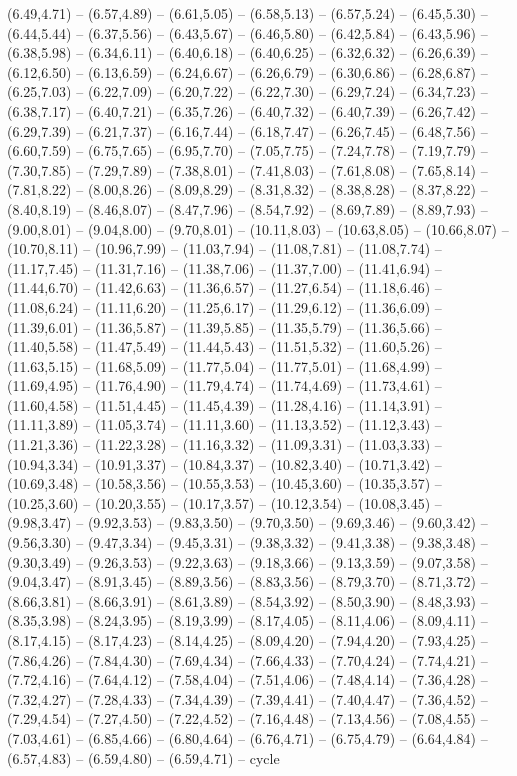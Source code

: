 \expandafter\def\csname geo:gebiet:heute-POL\endcsname{
  (6.49,4.71) -- (6.57,4.89) -- (6.61,5.05) -- (6.58,5.13) -- (6.57,5.24) -- (6.45,5.30) -- (6.44,5.44) -- (6.37,5.56) -- (6.43,5.67) -- (6.46,5.80) -- (6.42,5.84) -- (6.43,5.96) -- (6.38,5.98) -- (6.34,6.11) -- (6.40,6.18) -- (6.40,6.25) -- (6.32,6.32) -- (6.26,6.39) -- (6.12,6.50) -- (6.13,6.59) -- (6.24,6.67) -- (6.26,6.79) -- (6.30,6.86) -- (6.28,6.87) -- (6.25,7.03) -- (6.22,7.09) -- (6.20,7.22) -- (6.22,7.30) -- (6.29,7.24) -- (6.34,7.23) -- (6.38,7.17) -- (6.40,7.21) -- (6.35,7.26) -- (6.40,7.32) -- (6.40,7.39) -- (6.26,7.42) -- (6.29,7.39) -- (6.21,7.37) -- (6.16,7.44) -- (6.18,7.47) -- (6.26,7.45) -- (6.48,7.56) -- (6.60,7.59) -- (6.75,7.65) -- (6.95,7.70) -- (7.05,7.75) -- (7.24,7.78) -- (7.19,7.79) -- (7.30,7.85) -- (7.29,7.89) -- (7.38,8.01) -- (7.41,8.03) -- (7.61,8.08) -- (7.65,8.14) -- (7.81,8.22) -- (8.00,8.26) -- (8.09,8.29) -- (8.31,8.32) -- (8.38,8.28) -- (8.37,8.22) -- (8.40,8.19) -- (8.46,8.07) -- (8.47,7.96) -- (8.54,7.92) -- (8.69,7.89) -- (8.89,7.93) -- (9.00,8.01) -- (9.04,8.00) -- (9.70,8.01) -- (10.11,8.03) -- (10.63,8.05) -- (10.66,8.07) -- (10.70,8.11) -- (10.96,7.99) -- (11.03,7.94) -- (11.08,7.81) -- (11.08,7.74) -- (11.17,7.45) -- (11.31,7.16) -- (11.38,7.06) -- (11.37,7.00) -- (11.41,6.94) -- (11.44,6.70) -- (11.42,6.63) -- (11.36,6.57) -- (11.27,6.54) -- (11.18,6.46) -- (11.08,6.24) -- (11.11,6.20) -- (11.25,6.17) -- (11.29,6.12) -- (11.36,6.09) -- (11.39,6.01) -- (11.36,5.87) -- (11.39,5.85) -- (11.35,5.79) -- (11.36,5.66) -- (11.40,5.58) -- (11.47,5.49) -- (11.44,5.43) -- (11.51,5.32) -- (11.60,5.26) -- (11.63,5.15) -- (11.68,5.09) -- (11.77,5.04) -- (11.77,5.01) -- (11.68,4.99) -- (11.69,4.95) -- (11.76,4.90) -- (11.79,4.74) -- (11.74,4.69) -- (11.73,4.61) -- (11.60,4.58) -- (11.51,4.45) -- (11.45,4.39) -- (11.28,4.16) -- (11.14,3.91) -- (11.11,3.89) -- (11.05,3.74) -- (11.11,3.60) -- (11.13,3.52) -- (11.12,3.43) -- (11.21,3.36) -- (11.22,3.28) -- (11.16,3.32) -- (11.09,3.31) -- (11.03,3.33) -- (10.94,3.34) -- (10.91,3.37) -- (10.84,3.37) -- (10.82,3.40) -- (10.71,3.42) -- (10.69,3.48) -- (10.58,3.56) -- (10.55,3.53) -- (10.45,3.60) -- (10.35,3.57) -- (10.25,3.60) -- (10.20,3.55) -- (10.17,3.57) -- (10.12,3.54) -- (10.08,3.45) -- (9.98,3.47) -- (9.92,3.53) -- (9.83,3.50) -- (9.70,3.50) -- (9.69,3.46) -- (9.60,3.42) -- (9.56,3.30) -- (9.47,3.34) -- (9.45,3.31) -- (9.38,3.32) -- (9.41,3.38) -- (9.38,3.48) -- (9.30,3.49) -- (9.26,3.53) -- (9.22,3.63) -- (9.18,3.66) -- (9.13,3.59) -- (9.07,3.58) -- (9.04,3.47) -- (8.91,3.45) -- (8.89,3.56) -- (8.83,3.56) -- (8.79,3.70) -- (8.71,3.72) -- (8.66,3.81) -- (8.66,3.91) -- (8.61,3.89) -- (8.54,3.92) -- (8.50,3.90) -- (8.48,3.93) -- (8.35,3.98) -- (8.24,3.95) -- (8.19,3.99) -- (8.17,4.05) -- (8.11,4.06) -- (8.09,4.11) -- (8.17,4.15) -- (8.17,4.23) -- (8.14,4.25) -- (8.09,4.20) -- (7.94,4.20) -- (7.93,4.25) -- (7.86,4.26) -- (7.84,4.30) -- (7.69,4.34) -- (7.66,4.33) -- (7.70,4.24) -- (7.74,4.21) -- (7.72,4.16) -- (7.64,4.12) -- (7.58,4.04) -- (7.51,4.06) -- (7.48,4.14) -- (7.36,4.28) -- (7.32,4.27) -- (7.28,4.33) -- (7.34,4.39) -- (7.39,4.41) -- (7.40,4.47) -- (7.36,4.52) -- (7.29,4.54) -- (7.27,4.50) -- (7.22,4.52) -- (7.16,4.48) -- (7.13,4.56) -- (7.08,4.55) -- (7.03,4.61) -- (6.85,4.66) -- (6.80,4.64) -- (6.76,4.71) -- (6.75,4.79) -- (6.64,4.84) -- (6.57,4.83) -- (6.59,4.80) -- (6.59,4.71) -- cycle}

